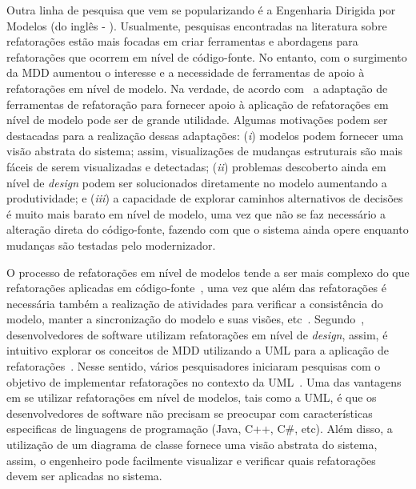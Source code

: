 Outra linha de pesquisa que vem se popularizando é a Engenharia Dirigida por Modelos (do inglês - ). Usualmente, pesquisas encontradas na literatura sobre refatorações estão mais focadas em criar ferramentas e abordagens para refatorações que ocorrem em nível de código-fonte. No entanto, com o surgimento da MDD aumentou o interesse e a necessidade de ferramentas de apoio à refatorações em nível de modelo. Na verdade, de acordo com~ a adaptação de ferramentas de refatoração para fornecer apoio à aplicação de refatorações em nível de modelo pode ser de grande utilidade. Algumas motivações podem ser destacadas para a realização dessas adaptações: (\emph{i}) modelos podem fornecer uma visão abstrata do sistema; assim, visualizações de mudanças estruturais são mais fáceis de serem visualizadas e detectadas; (\emph{ii}) problemas descoberto ainda em nível de \emph{design} podem ser solucionados diretamente no modelo aumentando a produtividade; e (\emph{iii}) a capacidade de explorar caminhos alternativos de decisões é muito mais barato em nível de modelo, uma vez que não se faz necessário a alteração direta do código-fonte, fazendo com que o sistema ainda opere enquanto mudanças são testadas pelo modernizador.


O processo de refatorações em nível de modelos tende a ser mais complexo do que refatorações aplicadas em código-fonte~\cite{Mens_2006}, uma vez que além das refatorações é necessária também a realização de atividades para verificar a consistência do modelo, manter a sincronização do modelo e suas visões, etc~\cite{KolahdouzRahimi20145}. Segundo~, desenvolvedores de software utilizam refatorações em nível de \emph{design}, assim, é intuitivo explorar os conceitos de MDD utilizando a UML para a aplicação de refatorações~\cite{Salem_2008, Gorp, Egyed_2008, Briand_2006, staron2004implementing}. Nesse sentido, vários pesquisadores iniciaram pesquisas com o objetivo de implementar refatorações no contexto da UML~\cite{revisao_sistematica_uml_refactoring}. Uma das vantagens em se utilizar refatorações em nível de modelos, tais como a UML, é que os desenvolvedores de software não precisam se preocupar com características especificas de linguagens de programação (Java, C++, C\#, etc). Além disso, a utilização de um diagrama de classe fornece uma visão abstrata do sistema, assim, o engenheiro pode facilmente visualizar e verificar quais refatorações devem ser aplicadas no sistema. 

